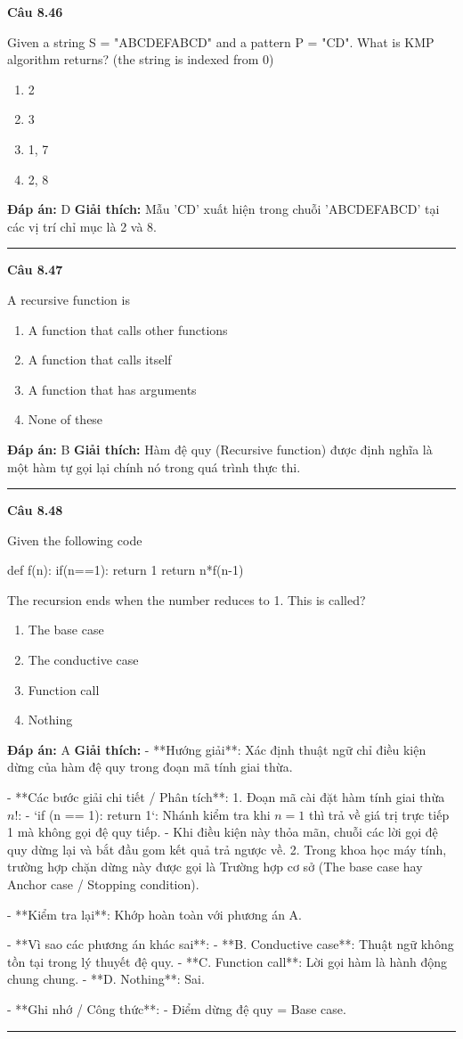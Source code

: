 \documentclass[11pt,a4paper]{article}
\newenvironment{question}[1]{%
  \par\vspace{1em}\noindent\textbf{\large Câu #1}\par\vspace{0.4em}
}{%
  \par\vspace{1em}\hrule\vspace{0.6em}
}
\newenvironment{choices}{%
  \begin{enumerate}[label=\textbf{\Alph*.},leftmargin=2.2em,itemsep=2pt,topsep=3pt]
}{%
  \end{enumerate}
}
\newcommand{\choice}{\item}
\newenvironment{codebox}{%
  \begin{tcolorbox}[colback=gray!8!white,colframe=gray!50!black,arc=1.5mm,boxrule=0.6pt,left=3mm,right=3mm,top=2.5mm,bottom=2.5mm]
  \ttfamily\small
}{%
  \end{tcolorbox}
}
\begin{document}
\begin{question}{8.46}
Given a string S = "ABCDEFABCD" and a pattern P = "CD". What is KMP algorithm returns? (the string is indexed from 0)
\begin{choices}
\choice 2
\choice 3
\choice 1, 7
\choice 2, 8
\end{choices}
\textbf{Đáp án:} D
\textbf{Giải thích:} Mẫu 'CD' xuất hiện trong chuỗi 'ABCDEFABCD' tại các vị trí chỉ mục là 2 và 8.
\end{question}

\begin{question}{8.47}
A recursive function is
\begin{choices}
\choice A function that calls other functions
\choice A function that calls itself
\choice A function that has arguments
\choice None of these
\end{choices}
\textbf{Đáp án:} B
\textbf{Giải thích:} Hàm đệ quy (Recursive function) được định nghĩa là một hàm tự gọi lại chính nó trong quá trình thực thi.
\end{question}

\begin{question}{8.48}
Given the following code
\begin{codebox}
def f(n):
    if(n==1):
        return 1
    return n*f(n-1)
\end{codebox}
The recursion ends when the number reduces to 1. This is called?
\begin{choices}
\choice The base case
\choice The conductive case
\choice Function call
\choice Nothing
\end{choices}
\textbf{Đáp án:} A
\textbf{Giải thích:} - **Hướng giải**:
  Xác định thuật ngữ chỉ điều kiện dừng của hàm đệ quy trong đoạn mã tính giai thừa.

- **Các bước giải chi tiết / Phân tích**:
  1. Đoạn mã cài đặt hàm tính giai thừa \(n!\):
     - `if (n == 1): return 1`: Nhánh kiểm tra khi \(n = 1\) thì trả về giá trị trực tiếp 1 mà không gọi đệ quy tiếp.
     - Khi điều kiện này thỏa mãn, chuỗi các lời gọi đệ quy dừng lại và bắt đầu gom kết quả trả ngược về.
  2. Trong khoa học máy tính, trường hợp chặn dừng này được gọi là Trường hợp cơ sở (The base case hay Anchor case / Stopping condition).

- **Kiểm tra lại**:
  Khớp hoàn toàn với phương án A.

- **Vì sao các phương án khác sai**:
  - **B. Conductive case**: Thuật ngữ không tồn tại trong lý thuyết đệ quy.
  - **C. Function call**: Lời gọi hàm là hành động chung chung.
  - **D. Nothing**: Sai.

- **Ghi nhớ / Công thức**:
  - Điểm dừng đệ quy = Base case.
\end{question}
\end{document}
